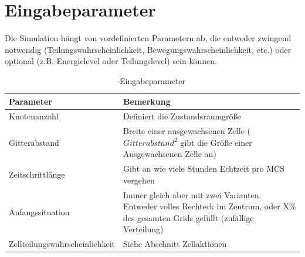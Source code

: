 \documentclass[11pt,a4paper,pointlessnumbers]{scrreprt}  %
\begin{document}
\section{Eingabeparameter}
Die Simulation hängt von vordefinierten Parametern ab, die entweder zwingend notwendig (Teilungswahrscheinlichkeit, Bewegungswahrscheinlichkeit, etc.) oder optional (z.B. Energielevel oder Teilungslevel) sein können.



\begin{table}[!ht]
	\centering
	\caption{Eingabeparameter}
	\label{my-label}
	\begin{tabularx}{\textwidth}{lX}
		\toprule
		\textbf{Parameter}             & \textbf{Bemerkung}                                                                                                                                                                                                                             \\ \midrule
		Knotenanzahl                   & Definiert die Zustandsraumgröße                                                                                                                                                                                                                \\
		Gitterabstand                  & Breite einer ausgewachsenen Zelle ($Gitterabstand^2$ gibt die Größe einer Ausgewachsenen Zelle an)                                                                                                                                                \\
		Zeitschrittlänge               & Gibt an wie viele Stunden Echtzeit pro MCS vergehen                                                                                                                                                                                            \\
		Anfangssituation               & Immer gleich aber mit zwei Varianten. Entweder volles Rechteck im Zentrum, oder X\% des gesamten Grids gefüllt (zufällige Verteilung)                                                                                                          \\
		Zellteilungswahrscheinlichkeit & Siehe Abschnitt Zellaktionen                                                                                                                                                                                                                   \\

\end{tabularx}
\end{table}
\end{document}
